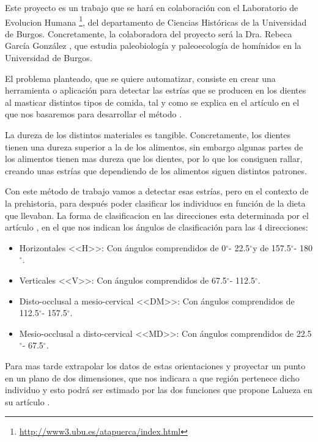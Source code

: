 \newcommand{\grad}{$^{\circ}$}
Este proyecto es un trabajo que se hará en colaboración con el Laboratorio de Evolucion Humana \footnote{ \url{http://www3.ubu.es/atapuerca/index.html}}, del departamento de Ciencias Históricas de la Universidad de Burgos. Concretamente, la colaboradora del proyecto será la Dra. Rebeca García González \cite{ubu:Rebe},  que estudia paleobiología y paleoecología de homínidos en la Universidad de Burgos. 

El problema planteado, que se quiere automatizar, consiste en crear una herramienta o aplicación para detectar las estrías que se producen en los dientes al masticar distintos tipos de comida, tal y como se explica en el artículo en el que nos basaremos para desarrollar el método \cite{garcia2015dietary}.

La dureza de los distintos materiales es tangible. Concretamente, los dientes tienen una dureza superior a la de los alimentos, sin embargo algunas partes de los alimentos tienen mas dureza que los dientes, por lo que los consiguen rallar, creando unas estrías que dependiendo de los alimentos siguen distintos patrones.

 
Con este método de trabajo vamos a detectar esas estrías, pero en el contexto de la prehistoria, para después poder clasificar los individuos en función de la dieta que llevaban. La forma de clasificacion en las direcciones esta determinada por el artículo \cite{garcia2015dietary}, en el que nos indican los ángulos de clasificación para las 4 direcciones:
\begin{itemize}
\item Horizontales <<H>>: Con ángulos comprendidos de 0\grad - 22.5\grad y de 157.5\grad - 180\grad.
\item Verticales <<V>>: Con ángulos comprendidos de 67.5\grad - 112.5\grad. 
\item Disto-occlusal a mesio-cervical <<DM>>: Con ángulos comprendidos de 112.5\grad - 157.5\grad.
\item Mesio-occlusal a disto-cervical <<MD>>: Con ángulos comprendidos de 22.5\grad - 67.5\grad.
\end{itemize}
Para mas tarde extrapolar los datos de estas orientaciones y proyectar un punto en un plano de dos dimensiones, que nos indicara a que región pertenece dicho individuo y esto podrá ser estimado por las dos funciones que propone Lalueza en su artículo \cite{Lalueza:perez}. 

